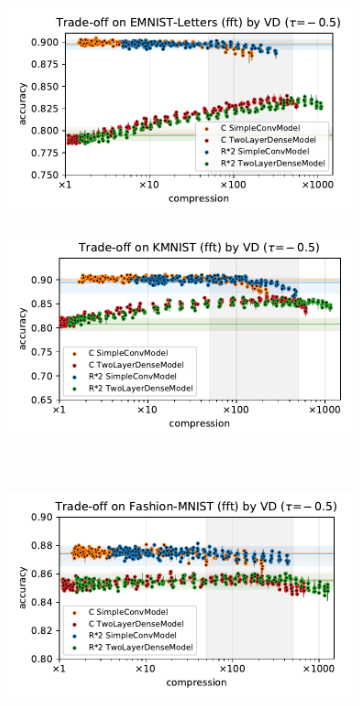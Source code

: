 \documentclass[a4paper,10pt,onecolumn]{article}
\begin{document}
\begin{figure}[b]
  \centering
  \begin{subfigure}[b]{0.5\columnwidth}
    \centering
    \includegraphics[width=\linewidth]{figure__mnist-like__trade-off/appendix__cmp__VD__emnist_letters__fft__-0.5.pdf}
  \end{subfigure}%
  \begin{subfigure}[b]{0.5\columnwidth}
    \centering
    \includegraphics[width=\linewidth]{figure__mnist-like__trade-off/appendix__cmp__VD__kmnist__fft__-0.5.pdf}
  \end{subfigure} \\ %
  \begin{subfigure}[b]{0.5\columnwidth}
    \centering
    \includegraphics[width=\linewidth]{figure__mnist-like__trade-off/appendix__cmp__VD__fashionmnist__fft__-0.5.pdf}

\end{subfigure}
\end{figure}
\end{document}
